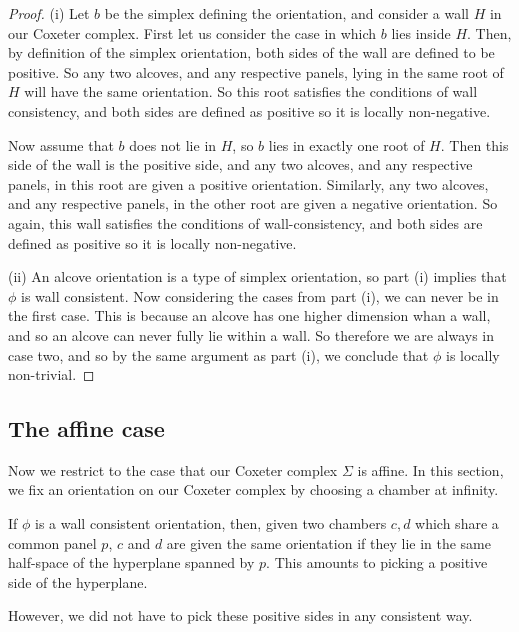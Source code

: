 \documentclass[11pt]{article}
\begin{document}
\begin{proof}
    (i) Let $b$ be the simplex defining the orientation, and consider a wall $H$ in our Coxeter complex. First let us consider the case in which $b$ lies inside $H$. Then, by definition of the simplex orientation, both sides of the wall are defined to be positive. So any two alcoves, and any respective panels, lying in the same root of $H$ will have the same orientation. So this root satisfies the conditions of wall consistency, and both sides are defined as positive so it is locally non-negative. 
    
    Now assume that $b$ does not lie in $H$, so $b$ lies in exactly one root of $H$. Then this side of the wall is the positive side, and any two alcoves, and any respective panels, in this root are given a positive orientation. Similarly, any two alcoves, and any respective panels, in the other root are given a negative orientation. So again, this wall satisfies the conditions of wall-consistency, and both sides are defined as positive so it is locally non-negative. 

    (ii) An alcove orientation is a type of simplex orientation, so part (i) implies that $\phi$ is wall consistent. Now considering the cases from part (i), we can never be in the first case. This is because an alcove has one higher dimension whan a wall, and so an alcove can never fully lie within a wall. So therefore we are always in case two, and so by the same argument as part (i), we conclude that $\phi$ is locally non-trivial. 
\end{proof}

\subsection{The affine case}

Now we restrict to the case that our Coxeter complex $\Sigma$ is affine. In this section, we fix an orientation on our Coxeter complex by choosing a chamber at infinity.

\begin{definition}
If $\phi$ is a wall consistent orientation, then, given two chambers $c,d$ which share a common panel $p$, $c$ and $d$ are given the same orientation if they lie in the same half-space of the hyperplane spanned by $p$. This amounts to picking a positive side of the hyperplane. 
\end{definition}

However, we did not have to pick these positive sides in any consistent way. 
\end{document}
